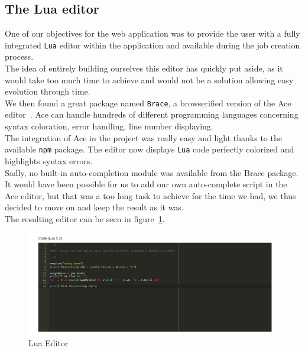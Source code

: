 \documentclass{eplmastersthesis}
\begin{document}
        \subsection{The Lua editor}

          One of our objectives for the web application was to provide the user
          with a fully integrated \texttt{Lua} editor within the application and
          available during the job creation process.\\
          The idea of entirely building ourselves this editor has quickly
          put aside, as it would take too much time to achieve and would not
          be a solution allowing easy evolution through time.\\
          We then found a great package named \texttt{Brace}, a browserified
          version of the Ace editor~\cite{Ace}. Ace can handle hundreds of
          different programming languages concerning syntax coloration,
          error handling, line number displaying.\\

          The integration of Ace in the project was really easy and light thanks
          to the available \texttt{npm} package. The editor now displays \texttt{Lua} code
          perfectly colorized and highlights syntax errors.\\

          Sadly, no built-in auto-completion module was available from the
          Brace package. It would have been possible for us to add our own
          auto-complete script in the Ace editor, but that was a too long
          task to achieve for the time we had, we thus decided to move on and
          keep the result as it was.\\

          The resulting editor can be seen in figure~\ref{luaeditor}.

          \begin{figure}
            \centering
            \includegraphics[scale=0.55]{figures/luaeditor.png}
            \caption{\label{luaeditor} Lua Editor}
          \end{figure}
\end{document}
